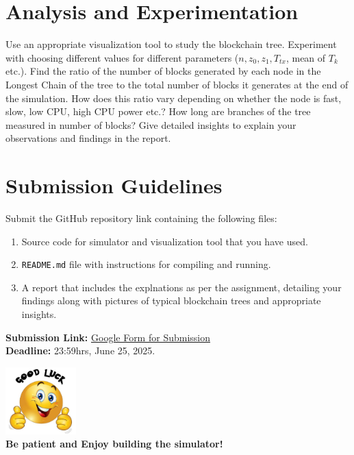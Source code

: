 \documentclass[12pt]{extarticle}
\newcommand{\allthebest}{\includegraphics[height=7em]{all_the_best.png}}
\begin{document}
\section*{Analysis and Experimentation}
Use an appropriate visualization tool to study the blockchain tree. Experiment with choosing different values for different parameters ($n, z_0, z_1, T_{tx}$, mean of $T_k$ etc.). Find the ratio of the number of blocks generated by each node in the Longest Chain of the tree to the total number of blocks it generates at the end of the simulation. How does this ratio vary depending on whether the node is fast, slow, low CPU, high CPU power etc.? How long are branches of the tree measured in number of blocks? Give detailed insights to explain your observations and findings in the report.
\section*{Submission Guidelines}
Submit the GitHub repository link containing the following files:
\begin{enumerate}
    \item Source code for simulator and visualization tool that you have used.
    \item \texttt{README.md} file with instructions for compiling and running.
    \item A report that includes the explnations as per the assignment, detailing your findings along with pictures of typical blockchain trees and appropriate insights.
\end{enumerate}
\textbf{Submission Link:} \href{https://docs.google.com/forms/d/e/1FAIpQLSf3PmpIGiE9gxEq83tuMBG4SozIBBrWrcAXwvg-zlrZ72bfVQ/viewform?usp=dialog}{Google Form for Submission}\\
\textbf{Deadline:} 23:59hrs, June 25, 2025.\\
\vspace{1cm}
\begin{center}
    \allthebest\\
    \textbf{Be patient and Enjoy building the simulator!}
\end{center}
\end{document}
